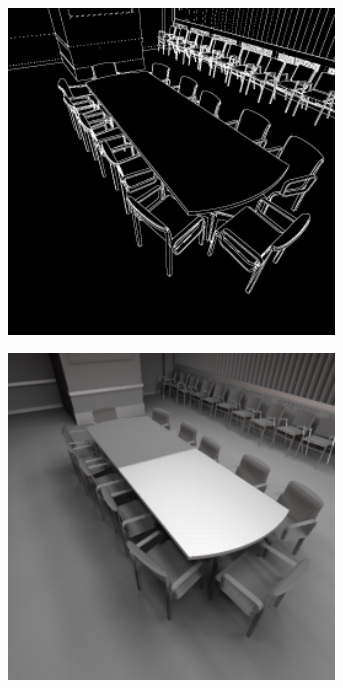 \begin{figure}[htb]
\begin{subfigure}[b]{0.33\textwidth}
    \caption{\label{fig:concept:interleaved_segovia_4}}
  \end{subfigure}%
  \begin{subfigure}[b]{0.33\textwidth}
    \centering\includegraphics[width=0.95\textwidth]{graphics/interleaved_segovia_5}
    \caption{\label{fig:concept:interleaved_segovia_5}}
  \end{subfigure}%
  \begin{subfigure}[b]{0.33\textwidth}
    \centering\includegraphics[width=0.95\textwidth]{graphics/interleaved_segovia_6}

\end{subfigure}
\end{figure}
